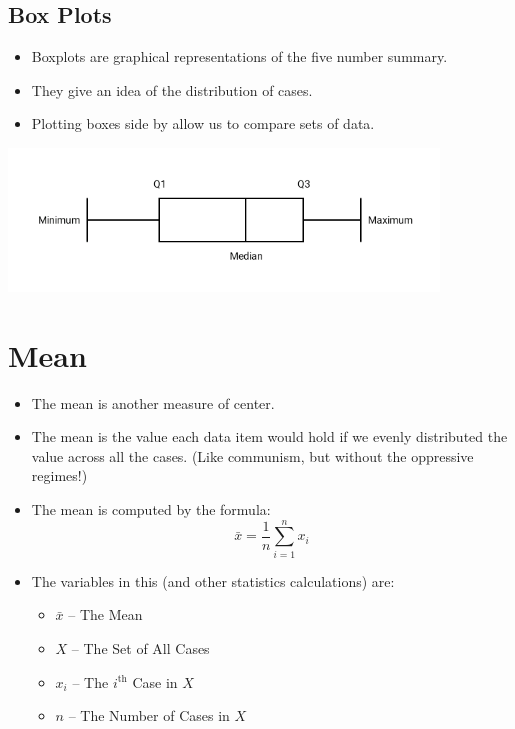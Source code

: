 \documentclass{article}
\begin{document}
\subsection{Box Plots}
\begin{itemize}
    \item Boxplots are graphical representations of the five number
        summary.
    \item They give an idea of the distribution of cases.
    \item Plotting boxes side by allow us to compare sets of data.
\end{itemize}
\begin{center}
\includegraphics[height=1.5in]{images/Boxplot}
\end{center}
\pagebreak

\section{Mean}
\begin{itemize}
    \item The mean is another measure of center.
    \item The mean is the value each data item would hold if we evenly
        distributed the value across all the cases. (Like communism,
        but without the oppressive regimes!)
    \item The mean is computed by the formula:
    \[
        \bar{x} = \dfrac{1}{n} \displaystyle\sum_{i=1}^{n} x_i
    \]
    \item The variables in this (and other statistics calculations)
    are:
    \begin{itemize}
        \item $\bar{x}$ -- The Mean
        \item $X$ -- The Set of All Cases
        \item $x_i$ -- The $i^\mathrm{th}$ Case in $X$
        \item $n$ -- The Number of Cases in $X$
    \end{itemize}
\end{itemize}
\end{document}
